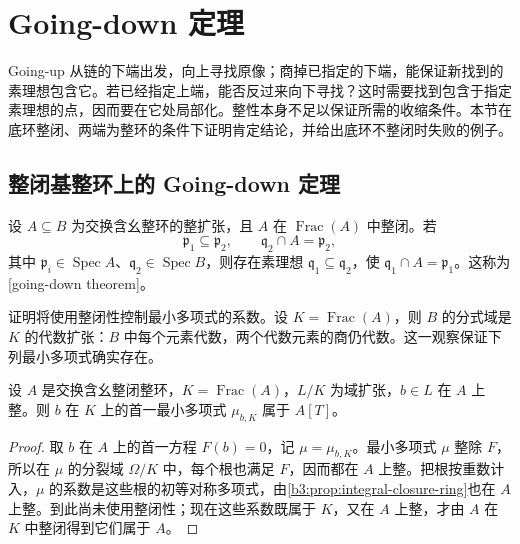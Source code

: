 
\section{Going-down 定理}\label{b3:sec:0503}

Going-up 从链的下端出发，向上寻找原像；商掉已指定的下端，能保证新找到的素理想包含它。若已经指定上端，能否反过来向下寻找？这时需要找到包含于指定素理想的点，因而要在它处局部化。整性本身不足以保证所需的收缩条件。本节在底环整闭、两端为整环的条件下证明肯定结论，并给出底环不整闭时失败的例子。

\subsection{整闭基整环上的 Going-down 定理}\label{b3:subsec:0503:01}

\begin{theorem}\label{b3:thm:going-down}
	设 \(A\subseteq B\) 为交换含幺整环的整扩张，且 \(A\) 在 \(\operatorname{Frac}(A)\) 中整闭。若
	\[
		\mathfrak p_1\subseteq\mathfrak p_2,\qquad \mathfrak q_2\cap A=\mathfrak p_2,
	\]
	其中 \(\mathfrak p_i\in\operatorname{Spec}A\)、\(\mathfrak q_2\in\operatorname{Spec}B\)，则存在素理想 \(\mathfrak q_1\subseteq\mathfrak q_2\)，使 \(\mathfrak q_1\cap A=\mathfrak p_1\)。这称为[going-down theorem]。
\end{theorem}

证明将使用整闭性控制最小多项式的系数。设 \(K=\operatorname{Frac}(A)\)，则 \(B\) 的分式域是 \(K\) 的代数扩张：\(B\) 中每个元素代数，两个代数元素的商仍代数。这一观察保证下列最小多项式确实存在。

\begin{lemma}\label{b3:lem:minimal-polynomial-integral-coefficients}
	设 \(A\) 是交换含幺整闭整环，\(K=\operatorname{Frac}(A)\)，\(L/K\) 为域扩张，\(b\in L\) 在 \(A\) 上整。则 \(b\) 在 \(K\) 上的首一最小多项式 \(\mu_{b,K}\) 属于 \(A[T]\)。
\end{lemma}
\begin{proof}
	取 \(b\) 在 \(A\) 上的首一方程 \(F(b)=0\)，记 \(\mu=\mu_{b,K}\)。最小多项式 \(\mu\) 整除 \(F\)，所以在 \(\mu\) 的分裂域 \(\Omega/K\) 中，每个根也满足 \(F\)，因而都在 \(A\) 上整。把根按重数计入，\(\mu\) 的系数是这些根的初等对称多项式，由\cref{b3:prop:integral-closure-ring}也在 \(A\) 上整。到此尚未使用整闭性；现在这些系数既属于 \(K\)，又在 \(A\) 上整，才由 \(A\) 在 \(K\) 中整闭得到它们属于 \(A\)。
\end{proof}

